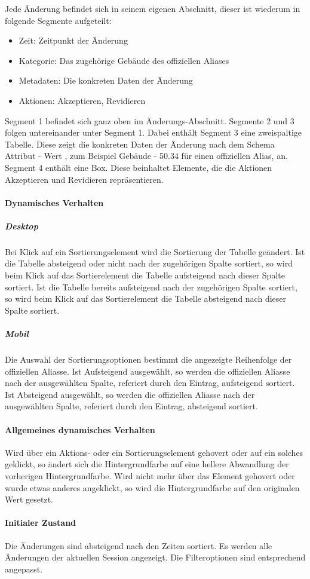 Jede Änderung befindet sich in seinem eigenen Abschnitt, dieser ist wiederum in folgende Segmente aufgeteilt:

\begin{itemize}
    \item Zeit: Zeitpunkt der Änderung
    \item Kategorie: Das zugehörige Gebäude des offiziellen Aliases
    \item Metadaten: Die konkreten Daten der Änderung
    \item Aktionen: Akzeptieren, Revidieren
\end{itemize}

Segment 1 befindet sich ganz oben im Änderungs-Abschnitt. Segmente 2 und 3 folgen untereinander unter Segment 1.
Dabei enthält Segment 3 eine zweispaltige Tabelle. Diese zeigt die konkreten Daten der Änderung nach dem Schema \dq Attribut - Wert \dq{}, zum Beispiel \dq Gebäude - 50.34 \dq{} für einen offiziellen Alias, an.
Segment 4 enthält eine Box. Diese beinhaltet Elemente, die die Aktionen \dq Akzeptieren \dq{} und \dq Revidieren \dq{} repräsentieren.

\paragraph*{Dynamisches Verhalten}
\subparagraph*{Desktop}
Bei Klick auf ein Sortierungselement wird die Sortierung der Tabelle geändert.
Ist die Tabelle absteigend oder nicht nach der zugehörigen Spalte sortiert, so wird beim Klick auf das Sortierelement die Tabelle aufsteigend nach dieser Spalte sortiert.
Ist die Tabelle bereits aufsteigend nach der zugehörigen Spalte sortiert, so wird beim Klick auf das Sortierelement die Tabelle absteigend nach dieser Spalte sortiert.

\subparagraph*{Mobil}
Die Auswahl der Sortierungsoptionen bestimmt die angezeigte Reihenfolge der offiziellen Aliasse.
Ist \dq Aufsteigend \dq{} ausgewählt, so werden die offiziellen Aliasse nach der ausgewählten Spalte, referiert durch den Eintrag, aufsteigend sortiert.
Ist \dq Absteigend \dq{} ausgewählt, so werden die offiziellen Aliasse nach der ausgewählten Spalte, referiert durch den Eintrag, absteigend sortiert.

\paragraph*{Allgemeines dynamisches Verhalten}
Wird über ein Aktions- oder ein Sortierungselement gehovert oder auf ein solches geklickt, so ändert sich die Hintergrundfarbe auf eine hellere Abwandlung der vorherigen Hintergrundfarbe.
Wird nicht mehr über das Element gehovert oder wurde etwas anderes angeklickt, so wird die Hintergrundfarbe auf den originalen Wert gesetzt.

\paragraph*{Initialer Zustand}
Die Änderungen sind absteigend nach den Zeiten sortiert.
Es werden alle Änderungen der aktuellen Session angezeigt.
Die Filteroptionen sind entsprechend angepasst.